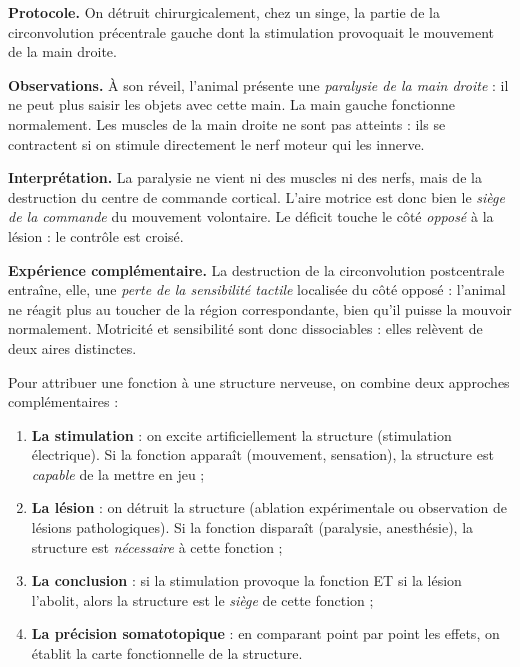 \documentclass[11pt]{article}
\begin{document}
\begin{experience}
\textbf{Protocole.} On détruit chirurgicalement, chez un singe, la partie de la circonvolution précentrale gauche dont la stimulation provoquait le mouvement de la main droite.

\textbf{Observations.} À son réveil, l'animal présente une \emph{paralysie de la main droite} : il ne peut plus saisir les objets avec cette main. La main gauche fonctionne normalement. Les muscles de la main droite ne sont pas atteints : ils se contractent si on stimule directement le nerf moteur qui les innerve.

\textbf{Interprétation.} La paralysie ne vient ni des muscles ni des nerfs, mais de la destruction du centre de commande cortical. L'aire motrice est donc bien le \emph{siège de la commande} du mouvement volontaire. Le déficit touche le côté \emph{opposé} à la lésion : le contrôle est croisé.

\textbf{Expérience complémentaire.} La destruction de la circonvolution postcentrale entraîne, elle, une \emph{perte de la sensibilité tactile} localisée du côté opposé : l'animal ne réagit plus au toucher de la région correspondante, bien qu'il puisse la mouvoir normalement. Motricité et sensibilité sont donc dissociables : elles relèvent de deux aires distinctes.
\end{experience}

\begin{methode}
Pour attribuer une fonction à une structure nerveuse, on combine deux approches complémentaires :
\begin{enumerate}
\item \textbf{La stimulation} : on excite artificiellement la structure (stimulation électrique). Si la fonction apparaît (mouvement, sensation), la structure est \emph{capable} de la mettre en jeu ;
\item \textbf{La lésion} : on détruit la structure (ablation expérimentale ou observation de lésions pathologiques). Si la fonction disparaît (paralysie, anesthésie), la structure est \emph{nécessaire} à cette fonction ;
\item \textbf{La conclusion} : si la stimulation provoque la fonction ET si la lésion l'abolit, alors la structure est le \emph{siège} de cette fonction ;
\item \textbf{La précision somatotopique} : en comparant point par point les effets, on établit la carte fonctionnelle de la structure.
\end{enumerate}
\end{methode}
\end{document}
